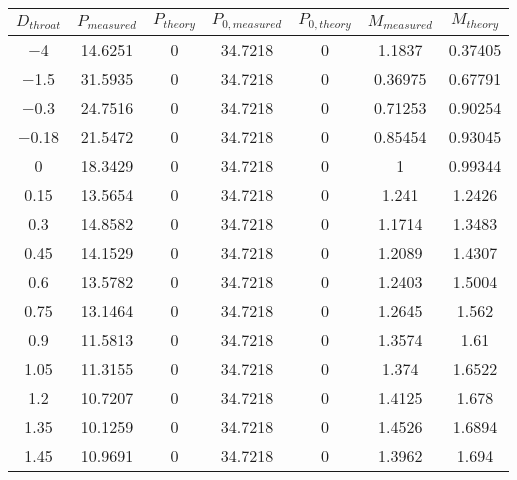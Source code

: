 \begin{tabular}{ccccccc}
\toprule
$D_{throat}$ & $P_{measured}$ & $P_{theory}$ & $P_{0,measured}$ & $P_{0,theory}$ & $M_{measured}$ & $M_{theory}$ \\
\midrule
\num{-4} & \num{14.6251} & \num{0} & \num{34.7218} & \num{0} & \num{1.1837} & \num{0.37405} \\ 
\num{-1.5} & \num{31.5935} & \num{0} & \num{34.7218} & \num{0} & \num{0.36975} & \num{0.67791} \\ 
\num{-0.3} & \num{24.7516} & \num{0} & \num{34.7218} & \num{0} & \num{0.71253} & \num{0.90254} \\ 
\num{-0.18} & \num{21.5472} & \num{0} & \num{34.7218} & \num{0} & \num{0.85454} & \num{0.93045} \\ 
\num{0} & \num{18.3429} & \num{0} & \num{34.7218} & \num{0} & \num{1} & \num{0.99344} \\ 
\num{0.15} & \num{13.5654} & \num{0} & \num{34.7218} & \num{0} & \num{1.241} & \num{1.2426} \\ 
\num{0.3} & \num{14.8582} & \num{0} & \num{34.7218} & \num{0} & \num{1.1714} & \num{1.3483} \\ 
\num{0.45} & \num{14.1529} & \num{0} & \num{34.7218} & \num{0} & \num{1.2089} & \num{1.4307} \\ 
\num{0.6} & \num{13.5782} & \num{0} & \num{34.7218} & \num{0} & \num{1.2403} & \num{1.5004} \\ 
\num{0.75} & \num{13.1464} & \num{0} & \num{34.7218} & \num{0} & \num{1.2645} & \num{1.562} \\ 
\num{0.9} & \num{11.5813} & \num{0} & \num{34.7218} & \num{0} & \num{1.3574} & \num{1.61} \\ 
\num{1.05} & \num{11.3155} & \num{0} & \num{34.7218} & \num{0} & \num{1.374} & \num{1.6522} \\ 
\num{1.2} & \num{10.7207} & \num{0} & \num{34.7218} & \num{0} & \num{1.4125} & \num{1.678} \\ 
\num{1.35} & \num{10.1259} & \num{0} & \num{34.7218} & \num{0} & \num{1.4526} & \num{1.6894} \\ 
\num{1.45} & \num{10.9691} & \num{0} & \num{34.7218} & \num{0} & \num{1.3962} & \num{1.694} \\ 
\bottomrule
\end{tabular}